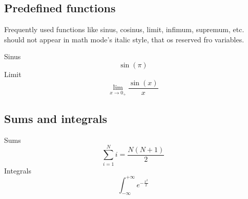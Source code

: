 \documentclass[a4paper]{article}
\begin{document}
\subsection{Predefined functions}
Frequently used functions like sinus, cosinus, limit, infimum, supremum, etc. should not appear in math mode's italic style, that os reserved fro variables.

Sinus
\begin{equation}
	\sin(\pi)
\end{equation}
Limit
\begin{equation}
	\lim_{x\rightarrow 0_{+}} \frac{\sin(x)}{x}
\end{equation}
\subsection{Sums and integrals}
Sums
\begin{equation}
	\sum_{i=1}^{N}i = \frac{N(N+1)}{2}
\end{equation}
Integrals
\begin{equation}
	\int_{-\infty}^{+\infty}e^{-\frac{x^2}{2}}
\end{equation}
\end{document}
